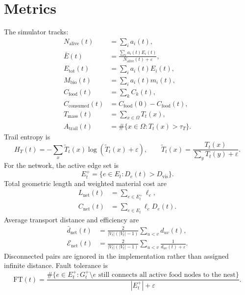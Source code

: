 \documentclass[11pt]{article}
\begin{document}
\section{Metrics}
The simulator tracks:
\begin{align}
  N_{\mathrm{alive}}(t)&=\sum_i a_i(t),\\
  \bar E(t)&=\frac{\sum_i a_i(t)E_i(t)}{N_{\mathrm{alive}}(t)+\varepsilon},\\
  E_{\mathrm{tot}}(t)&=\sum_i a_i(t)E_i(t),\\
  M_{\mathrm{bio}}(t)&=\sum_i a_i(t)m_i(t),\\
  C_{\mathrm{food}}(t)&=\sum_k C_k(t),\\
  C_{\mathrm{consumed}}(t)&=C_{\mathrm{food}}(0)-C_{\mathrm{food}}(t),\\
  T_{\mathrm{mass}}(t)&=\sum_{x\in\Omega}T_t(x),\\
  A_{\mathrm{trail}}(t)&=\#\{x\in\Omega:T_t(x)>\tau_T\}.
\end{align}
Trail entropy is
\begin{equation}
  H_T(t)=-\sum_x\tilde T_t(x)\log(\tilde T_t(x)+\varepsilon),
  \qquad
  \tilde T_t(x)=\frac{T_t(x)}{\sum_yT_t(y)+\varepsilon}.
\end{equation}
For the network, the active edge set is
\begin{equation}
  E_t^+=\{e\in E_t:D_e(t)>D_{\mathrm{vis}}\}.
\end{equation}
Total geometric length and weighted material cost are
\begin{align}
  L_{\mathrm{net}}(t)&=\sum_{e\in E_t^+}\ell_e,\\
  C_{\mathrm{net}}(t)&=\sum_{e\in E_t}\ell_eD_e(t).
\end{align}
Average transport distance and efficiency are
\begin{align}
  \bar d_{\mathrm{net}}(t)&=
  \frac{2}{|V_t|(|V_t|-1)}\sum_{u<v}d_{uv}(t),\\
  \mathcal{E}_{\mathrm{net}}(t)&=
  \frac{2}{|V_t|(|V_t|-1)}\sum_{u<v}\frac{1}{d_{uv}(t)+\varepsilon}.
\end{align}
Disconnected pairs are ignored in the implementation rather than assigned
infinite distance. Fault tolerance is
\begin{equation}
  \mathrm{FT}(t)=
  \frac{
  \#\{e\in E_t^+:G_t^+\setminus e\text{ still connects all active food nodes to the nest}\}
  }{|E_t^+|+\varepsilon}.
\end{equation}
\end{document}
